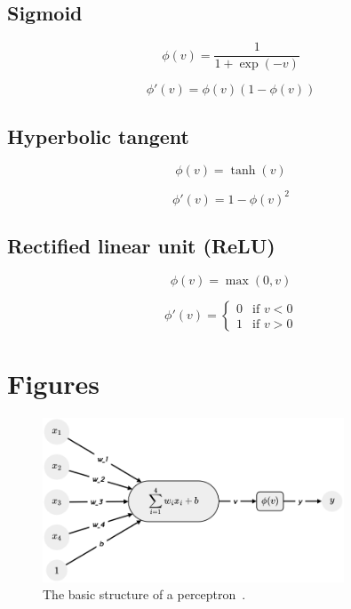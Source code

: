 \subsection{Sigmoid}\label{subsec:sigmoid}

\begin{equation}\label{eq:activation-sigmoid}
    \phi (v) = \frac{1}{1 + \exp(- v)}
\end{equation}

\begin{equation}\label{eq:activation-sigmoid-derivative}
    \phi' (v) = \phi (v) (1 - \phi (v))
\end{equation}


\subsection{Hyperbolic tangent}\label{subsec:hyperbolic-tangent}

\begin{equation}\label{eq:activation-tanh}
    \phi (v) = \tanh (v)
\end{equation}

\begin{equation}\label{eq:activation-tanh-derivative}
    \phi' (v) = 1 - \phi (v)^2
\end{equation}


\subsection{Rectified linear unit (ReLU)}\label{subsec:relu}

\begin{equation}\label{eq:activation-relu}
    \phi (v) = \max (0, v)
\end{equation}

\begin{equation}\label{eq:activation-relu-derivative}
    \phi' (v) =
    \begin{cases}
        0 & \text{if } v < 0 \\
        1 & \text{if } v > 0
    \end{cases}
\end{equation}

\section{Figures}\label{sec:figures-perceptron}

\begin{figure}[H]
    \centering
    \includegraphics[width=0.8\textwidth]{figures/perceptron/Perceptron1c}
    \caption[Caption used in list of tables]{The basic structure of a perceptron~\cite{MaadCookbook2024}.}
    \label{fig:Perceptron1}
\end{figure}

